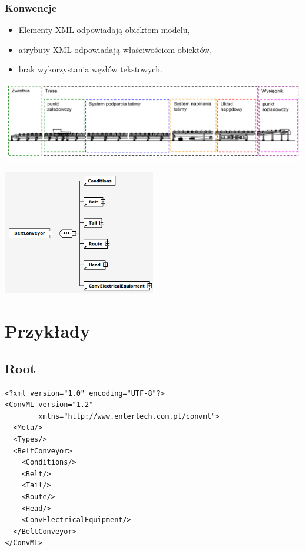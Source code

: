 \documentclass{beamer}
\begin{document}
\begin{frame}
\frametitle{Konwencje}
\begin{itemize}
\item Elementy XML odpowiadają obiektom modelu,
\item atrybuty XML odpowiadają właściwościom obiektów,
\item brak wykorzystania węzłów tekstowych.
\end{itemize}
\end{frame}

\begin{frame}
\includegraphics[width=\textwidth]{beamer/struktura}

\pause

\begin{center}
\includegraphics[width=0.5\textwidth]{png/przenosnik_xsd}
\end{center}
\end{frame}

\section{Przykłady}
\subsection{Root}
\begin{frame}[fragile]
\begin{verbatim}
<?xml version="1.0" encoding="UTF-8"?>
<ConvML version="1.2"
        xmlns="http://www.entertech.com.pl/convml">
  <Meta/>
  <Types/>
  <BeltConveyor>
    <Conditions/>
    <Belt/>
    <Tail/>
    <Route/>
    <Head/>
    <ConvElectricalEquipment/>
  </BeltConveyor>
</ConvML>
\end{verbatim}
\end{frame}
\end{document}
